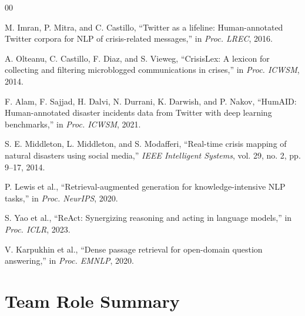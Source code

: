 \documentclass[conference]{IEEEtran}
\begin{document}
\begin{thebibliography}{00}

M. Imran, P. Mitra, and C. Castillo, ``Twitter as a lifeline: Human-annotated
Twitter corpora for NLP of crisis-related messages,'' in \textit{Proc. LREC},
2016.

A. Olteanu, C. Castillo, F. Diaz, and S. Vieweg, ``CrisisLex: A lexicon for
collecting and filtering microblogged communications in crises,'' in
\textit{Proc. ICWSM}, 2014.

F. Alam, F. Sajjad, H. Dalvi, N. Durrani, K. Darwish, and P. Nakov, ``HumAID:
Human-annotated disaster incidents data from Twitter with deep learning
benchmarks,'' in \textit{Proc. ICWSM}, 2021.

S. E. Middleton, L. Middleton, and S. Modafferi, ``Real-time crisis mapping of
natural disasters using social media,'' \textit{IEEE Intelligent Systems},
vol. 29, no. 2, pp. 9--17, 2014.

P. Lewis et al., ``Retrieval-augmented generation for knowledge-intensive NLP
tasks,'' in \textit{Proc. NeurIPS}, 2020.

S. Yao et al., ``ReAct: Synergizing reasoning and acting in language models,''
in \textit{Proc. ICLR}, 2023.

V. Karpukhin et al., ``Dense passage retrieval for open-domain question
answering,'' in \textit{Proc. EMNLP}, 2020.

\end{thebibliography}

\appendix

\section{Team Role Summary}
\end{document}

